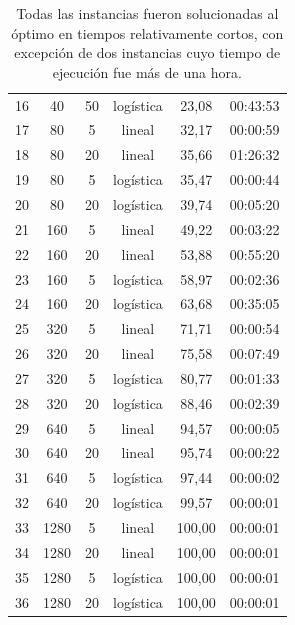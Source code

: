 \begin{table}
\begin{tabular}{SSScSc}
      16 & 40 & 50 & logística & 23,08 & 00:43:53 \\
      17 & 80 & 5 & lineal & 32,17 & 00:00:59 \\
      18 & 80 & 20 & lineal & 35,66 & 01:26:32 \\
      19 & 80 & 5 & logística & 35,47 & 00:00:44 \\
      20 & 80 & 20 & logística & 39,74 & 00:05:20 \\
      21 & 160 & 5 & lineal & 49,22 & 00:03:22 \\
      22 & 160 & 20 & lineal & 53,88 & 00:55:20 \\
      23 & 160 & 5 & logística & 58,97 & 00:02:36 \\
      24 & 160 & 20 & logística & 63,68 & 00:35:05 \\
      25 & 320 & 5 & lineal & 71,71 & 00:00:54 \\
      26 & 320 & 20 & lineal & 75,58 & 00:07:49 \\
      27 & 320 & 5 & logística & 80,77 & 00:01:33 \\
      28 & 320 & 20 & logística & 88,46 & 00:02:39 \\
      29 & 640 & 5 & lineal & 94,57 & 00:00:05 \\
      30 & 640 & 20 & lineal & 95,74 & 00:00:22 \\
      31 & 640 & 5 & logística & 97,44 & 00:00:02 \\
      32 & 640 & 20 & logística & 99,57 & 00:00:01 \\
      33 & 1280 & 5 & lineal & 100,00 & 00:00:01 \\
      34 & 1280 & 20 & lineal & 100,00 & 00:00:01 \\
      35 & 1280 & 5 & logística & 100,00 & 00:00:01 \\
      36 & 1280 & 20 & logística & 100,00 & 00:00:01 \\
    \bottomrule
  \end{tabular}
  \caption{Todas las instancias fueron solucionadas al óptimo en tiempos relativamente cortos, con excepción de dos instancias cuyo tiempo de ejecución fue más de una hora.} \label{table:sensibilityresults}
\end{table}

